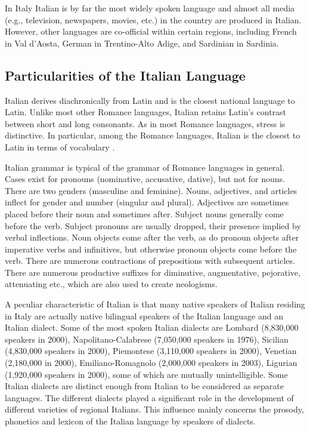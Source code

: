 \documentclass[]{../../metanetpaper}
\begin{document}
\begin{multicols}{2}
In Italy Italian is by far the most widely spoken language and almost all
media (e.g., television, newspapers, movies, etc.) in the country are produced
in Italian. However, other languages are co-official within certain regions,
including French in Val d'Aosta, German in Trentino-Alto Adige, and Sardinian
in Sardinia.


\subsection{Particularities of the Italian Language}

Italian derives diachronically from Latin and is the closest national language
to Latin. Unlike most other Romance languages, Italian retains Latin's
contrast between short and long consonants. As in most Romance languages,
stress is distinctive. In particular, among the Romance languages, Italian is
the closest to Latin in terms of vocabulary \cite{ethnologue}.

Italian grammar is typical of the grammar of Romance languages in
general. Cases exist for pronouns (nominative, accusative, dative), but not
for nouns. There are two genders (masculine and feminine). Nouns, adjectives,
and articles inflect for gender and number (singular and plural). Adjectives
are sometimes placed before their noun and sometimes after. Subject nouns
generally come before the verb. Subject pronouns are usually dropped, their
presence implied by verbal inflections. Noun objects come after the verb, as
do pronoun objects after imperative verbs and infinitives, but otherwise
pronoun objects come before the verb. There are numerous contractions of
prepositions with subsequent articles. There are numerous productive suffixes
for diminutive, augmentative, pejorative, attenuating etc., which are also
used to create neologisms.



A peculiar characteristic of Italian is that many native speakers of Italian
residing in Italy are actually native bilingual speakers of the Italian
language and an Italian dialect. Some of the most spoken Italian dialects are
Lombard (8,830,000 speakers in 2000), Napolitano-Calabrese (7,050,000 speakers
in 1976), Sicilian (4,830,000 speakers in 2000), Piemontese (3,110,000
speakers in 2000), Venetian (2,180,000 in 2000), Emiliano-Romagnolo (2,000,000
speakers in 2003), Ligurian (1,920,000 speakers in 2000), some of which are
mutually unintelligible. Some Italian dialects are distinct enough from
Italian to be considered as separate languages. The different dialects played
a significant role in the development of different varieties of regional
Italians. This influence mainly concerns the prosody, phonetics and lexicon of
the Italian language by speakers of dialects.






\end{multicols}
\end{document}
